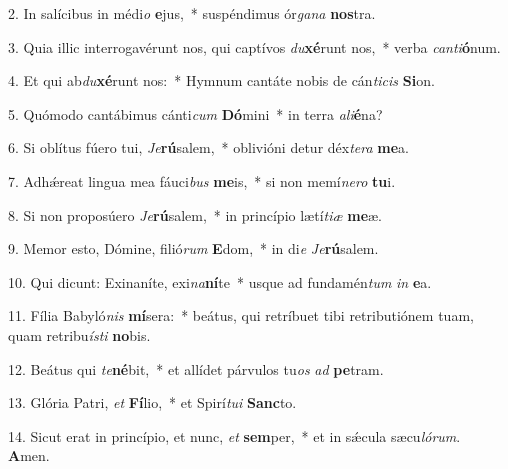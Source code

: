 2. In salícibus in médi\textit{o} \textbf{e}jus,~*  suspéndimus ór\textit{ga}\textit{na} \textbf{nos}tra.\

3. Quia illic interrogavérunt nos, qui captívos \textit{du}\textbf{xé}runt nos,~*  verba \textit{can}\textit{ti}\textbf{ó}num.\

4. Et qui ab\textit{du}\textbf{xé}runt nos:~*  Hymnum cantáte nobis de cán\textit{ti}\textit{cis} \textbf{Si}on.\

5. Quómodo cantábimus cánti\textit{cum} \textbf{Dó}mini~*  in terra \textit{a}\textit{li}\textbf{é}na?\

6. Si oblítus fúero tui, \textit{Je}\textbf{rú}salem,~*  oblivióni detur déx\textit{te}\textit{ra} \textbf{me}a.\

7. Adhǽreat lingua mea fáuci\textit{bus} \textbf{me}is,~*  si non memí\textit{ne}\textit{ro} \textbf{tu}i.\

8. Si non proposúero \textit{Je}\textbf{rú}salem,~*  in princípio lætí\textit{ti}\textit{æ} \textbf{me}æ.\

9. Memor esto, Dómine, filió\textit{rum} \textbf{E}dom,~*  in di\textit{e} \textit{Je}\textbf{rú}salem.\

10. Qui dicunt: Exinaníte, exi\textit{na}\textbf{ní}te~*  usque ad fundamén\textit{tum} \textit{in} \textbf{e}a.\

11. Fília Babyló\textit{nis} \textbf{mí}sera:~*  beátus, qui retríbuet tibi retributiónem tuam, quam retribu\textit{ís}\textit{ti} \textbf{no}bis.\

12. Beátus qui \textit{te}\textbf{né}bit,~*  et allídet párvulos tu\textit{os} \textit{ad} \textbf{pe}tram.\

13. Glória Patri, \textit{et} \textbf{Fí}lio,~*  et Spirí\textit{tu}\textit{i} \textbf{Sanc}to.\

14. Sicut erat in princípio, et nunc, \textit{et} \textbf{sem}per,~*  et in sǽcula sæcu\textit{ló}\textit{rum}. \textbf{A}men.\

